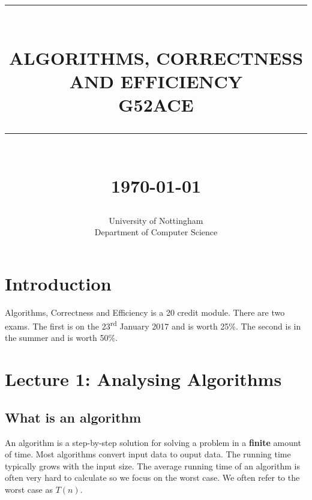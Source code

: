 \documentclass[12pt]{report}
\newcommand{\HRule}[1]{\rule{\linewidth}{#1}}
\begin{document}
\title{ \normalsize \textsc{}
		\\ [2.0cm]
		\HRule{0.5pt} \\
                \LARGE \textbf{\uppercase{Algorithms, Correctness \\and Efficiency\\G52ACE}}
		\HRule{2pt} \\ [0.5cm]
		\normalsize \today \vspace*{5\baselineskip}}

\date{}

\author{
		University of Nottingham\\
		Department of Computer Science }

\maketitle
\tableofcontents
\newpage

\sectionfont{\scshape}


\section*{Introduction}
Algorithms, Correctness and Efficiency is a 20 credit module. There are two exams. The first is on the 23\textsuperscript{rd} January 2017 and is worth 25\%. The second is in the summer and is worth 50\%.

\section*{Lecture 1: Analysing Algorithms}

\subsection*{What is an algorithm}
An algorithm is a step-by-step solution for solving a problem in a \textbf{finite} amount of time. Most algorithms convert input data to ouput data. The running time typically grows with the input size. The average running time of an algorithm is often very hard to calculate so we focus on the worst case. We often refer to the worst case as $T(n)$.
\end{document}

